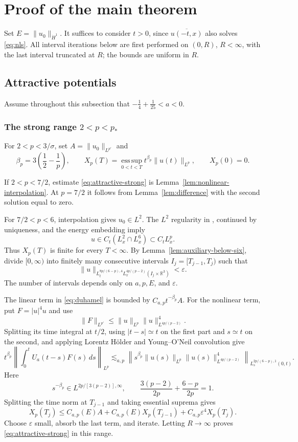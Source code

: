 \documentclass[preprint,12pt]{elsarticle}
\numberwithin{equation}{section}
\theoremstyle{definition}
\theoremstyle{remark}
\newcommand{\R}{\mathbb R}
\newcommand{\norm}[2]{\lVert #1\rVert_{#2}}
\newcommand{\eps}{\varepsilon}
\begin{document}
\section{Proof of the main theorem}

Set $E=\norm{u_0}{\dot H^1}$. It suffices to consider $t>0$, since
$\overline{u(-t,x)}$ also solves \eqref{eq:nls}. All interval
iterations below are first performed on $(0,R)$, $R<\infty$, with
the last interval truncated at $R$; the bounds are uniform in $R$.

\subsection{Attractive potentials}

Assume throughout this subsection that
$-\frac14+\frac1{25}<a<0$.

\subsubsection{\texorpdfstring{The strong range $2<p<p_*$}%
 {The strong range 2 < p < p*}}

For $2<p<3/\sigma$, set $A=\norm{u_0}{L^{p'}}$ and
\[
 \beta_p=3\left(\frac12-\frac1p\right),
 \qquad
 X_p(T)=\operatorname*{ess\,sup}_{0<t<T}
 t^{\beta_p}\norm{u(t)}{L^p},\qquad X_p(0)=0.
\]

If $2<p<7/2$, estimate \eqref{eq:attractive-strong} is
Lemma~\ref{lem:nonlinear-interpolation}.  At $p=7/2$ it follows from
Lemma~\ref{lem:difference} with the second solution equal to zero.

For $7/2<p<6$, interpolation gives $u_0\in L^2$. The $L^2$
regularity in \cite[Proposition~2.10]{KillipNLS}, continued by
uniqueness, and the energy embedding imply
\[
 u\in C_t(L_x^2\cap L_x^6)\subset C_tL_x^p.
\]
Thus $X_p(T)$ is finite for every $T<\infty$.  By
Lemma~\ref{lem:auxiliary-below-six}, divide $[0,\infty)$ into finitely
many consecutive intervals $I_j=[T_{j-1},T_j)$ such that
\[
 \norm{u}{L_t^{8p/(6-p),4}L_x^{4p/(p-2)}(I_j\times\R^3)}
 <\eps.
\]
The number of intervals depends only on $a,p,E$, and $\eps$.

The linear term in \eqref{eq:duhamel} is bounded by
$C_{a,p}t^{-\beta_p}A$. For the nonlinear term, put
$F=|u|^4u$ and use
\[
 \norm{F}{L^{p'}}
 \leq\norm{u}{L^p}\norm{u}{L^{4p/(p-2)}}^4.
\]
Splitting its time integral at $t/2$, using $|t-s|\simeq t$ on the
first part and $s\simeq t$ on the second, and applying Lorentz
H\"older and Young--O'Neil convolution give
\[
 t^{\beta_p}
 \left\|\int_0^tU_a(t-s)F(s)\,ds\right\|_{L^p}
 \lesssim_{a,p}
 \left\|s^{\beta_p}\norm{u(s)}{L^p}
 \norm{u(s)}{L^{4p/(p-2)}}^4
 \right\|_{L_s^{2p/(6-p),1}(0,t)}.
\]
Here
\[
 s^{-\beta_p}\in L^{2p/[3(p-2)],\infty},
 \qquad
 \frac{3(p-2)}{2p}+\frac{6-p}{2p}=1.
\]
Splitting the time norm at $T_{j-1}$ and taking essential suprema gives
\[
 X_p(T_j)
 \leq C_{a,p}(E)A+C_{a,p}(E)X_p(T_{j-1})
 +C_{a,p}\eps^4X_p(T_j).
\]
Choose $\eps$ small, absorb the last term, and iterate. Letting
$R\to\infty$ proves \eqref{eq:attractive-strong} in this range.
\end{document}
